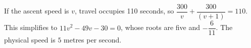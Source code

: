 If the ascent speed is $v$, travel occupies 110 seconds, so $\dfrac{300}{v}+\dfrac{300}{(v+1)}=110$. This simplifies to $11v^2-49v-30=0$, whose roots are five and $-\dfrac{6}{11}$. The physical speed is $\boxed5$ metres per second.
